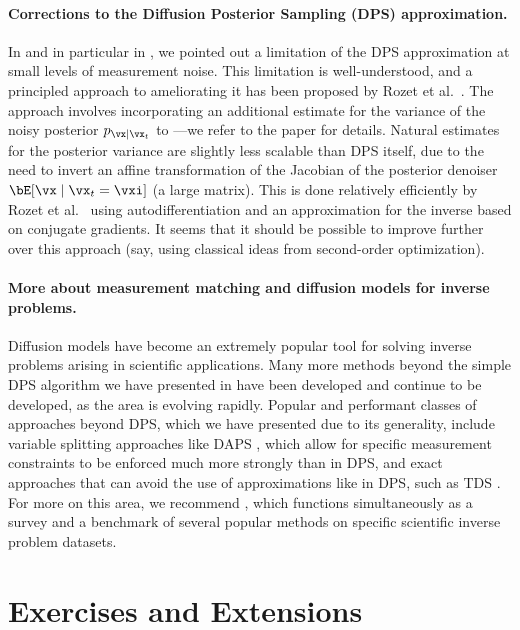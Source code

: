 \documentclass[../../book-main.tex]{subfiles}
\begin{document}
\paragraph{Corrections to the Diffusion Posterior Sampling (DPS) approximation.}
In  and in particular in
, we pointed out
a limitation of the DPS approximation
 at
small levels of measurement noise. 
This limitation is well-understood, and a principled approach to ameliorating it
has been proposed by Rozet et al.\ \cite{rozet2024learning}.
The approach involves incorporating an additional estimate for the variance of
the noisy posterior $p_{\vx \mid \vx_t}$ to
---we
refer to the paper for details.
Natural estimates for the posterior variance are slightly less scalable than DPS
itself, due to the need to invert an affine transformation of the Jacobian of
the posterior denoiser $\bE[\vx \mid \vx_t=\vxi]$ (a large matrix). This is done
relatively efficiently by Rozet et al.\ \cite{rozet2024learning} using autodifferentiation and an
approximation for the inverse based on conjugate gradients. It seems that it
should be possible to improve further over this approach (say, using classical
ideas from second-order optimization).


\paragraph{More about measurement matching and diffusion models for inverse
problems.} 

Diffusion models have become an extremely popular tool for solving inverse
problems arising in scientific applications. Many more methods beyond the simple
DPS algorithm we have presented in  have been
developed and continue to be developed, as the area is evolving rapidly.
Popular and performant classes of approaches beyond DPS, which we have presented
due to its generality, include variable splitting approaches like DAPS
\cite{Zhang2024-ha},
which allow for specific measurement constraints to be enforced much more
strongly than in DPS, and exact approaches that can avoid the use of
approximations like in DPS, such as TDS \cite{wu2023practical}.
For more on this area, we recommend \cite{zheng2025inversebench}, which
functions simultaneously as a survey and a benchmark of several popular methods
on specific scientific inverse problem datasets.

\section{Exercises and Extensions}
\end{document}
